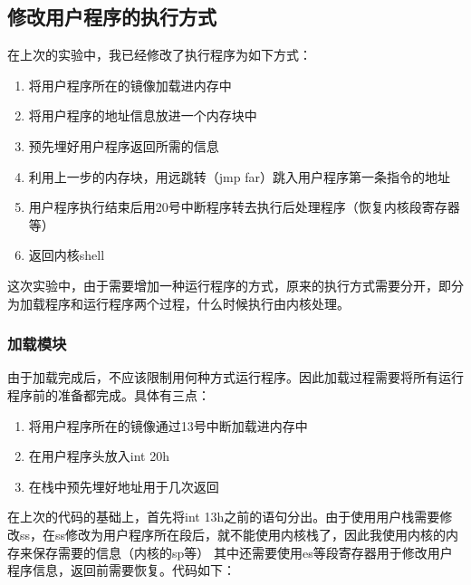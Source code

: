 \documentclass[a4paper, 11pt]{article} %
\begin{document}
\subsection{修改用户程序的执行方式}
在上次的实验中，我已经修改了执行程序为如下方式：
\begin{enumerate}
  \item 将用户程序所在的镜像加载进内存中
  \item 将用户程序的地址信息放进一个内存块中
  \item 预先埋好用户程序返回所需的信息
  \item 利用上一步的内存块，用远跳转（jmp far）跳入用户程序第一条指令的地址
  \item 用户程序执行结束后用20号中断程序转去执行后处理程序（恢复内核段寄存器等）
  \item 返回内核shell
\end{enumerate}

这次实验中，由于需要增加一种运行程序的方式，原来的执行方式需要分开，即分为加载程序和运行程序两个过程，什么时候执行由内核处理。
\subsubsection{加载模块}
由于加载完成后，不应该限制用何种方式运行程序。因此加载过程需要将所有运行程序前的准备都完成。具体有三点：
\begin{enumerate}
  \item 将用户程序所在的镜像通过13号中断加载进内存中
  \item 在用户程序头放入int 20h
  \item 在栈中预先埋好地址用于几次返回
\end{enumerate}
在上次的代码的基础上，首先将int 13h之前的语句分出。由于使用用户栈需要修改ss，在ss修改为用户程序所在段后，就不能使用内核栈了，因此我使用内核的内存来保存需要的信息（内核的sp等）
其中还需要使用es等段寄存器用于修改用户程序信息，返回前需要恢复。代码如下：
\end{document}
